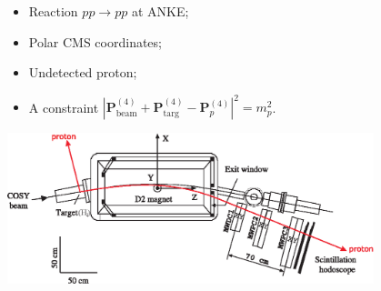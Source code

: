 \begin{itemize}
\item Reaction $pp \to pp$ at ANKE;
\item Polar CMS coordinates;
\item Undetected proton;
\item A constraint $\left|\boldsymbol{P}^{(4)}_\mathrm{beam}+\boldsymbol{P}^{(4)}_\mathrm{targ}-\boldsymbol{P}^{(4)}_p\right|^2 = m_p^2$.
\end{itemize}

\centering\includegraphics[width=0.8\textwidth]{pics/setup_.eps}

